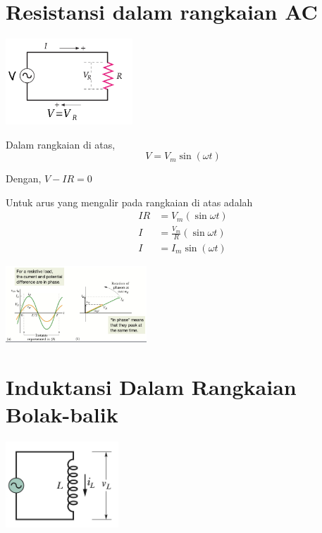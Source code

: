 \documentclass[twocolumn, 11pt]{article}%
\begin{document}
\section{Resistansi dalam rangkaian AC}%

\begin{center}
    \includegraphics[width=180px]{3.png}
\end{center}

Dalam rangkaian di atas,
\[ V=V_m \sin (\omega t) \]

Dengan, $V-IR=0$

Untuk arus yang mengalir pada rangkaian di atas adalah
\begin{align*}
    IR &= V_m (\sin \omega t)\\
    I &= \frac{V_m}{R}(\sin \omega t)\\
    I &=I_m \sin (\omega t)
\end{align*}

\begin{center}
    \includegraphics[width=200px]{4.png}
\end{center}

\section{Induktansi Dalam Rangkaian Bolak-balik}%

\begin{center}
    \includegraphics[width=160px]{5.png}
\end{center}
\end{document}

